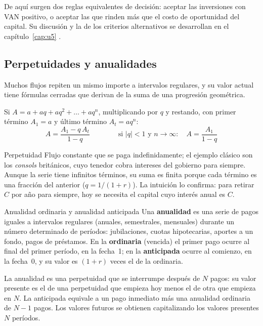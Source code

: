 De aquí surgen dos reglas equivalentes de decisión: aceptar las inversiones con VAN positivo, o aceptar las que rinden más que el costo de oportunidad del capital. Su discusión y la de los criterios alternativos se desarrollan en el capítulo~\ref{cap:u5} .

\subsection{Perpetuidades y anualidades}

Muchos flujos repiten un mismo importe a intervalos regulares, y su valor actual tiene fórmulas cerradas que derivan de la suma de una progresión geométrica.

\begin{formulaBox}
Si $A = a + aq + aq^2 + \dots + aq^n$, multiplicando por $q$ y restando, con primer término $A_1 = a$ y último término $A_t = aq^n$:
\[
A = \frac{A_1 - q\,A_t}{1-q}
\qquad\qquad
\text{si } |q|<1 \text{ y } n\to\infty:\quad A = \frac{A_1}{1-q}
\]
\end{formulaBox}

\begin{definicion}{Perpetuidad}
Flujo constante que se paga indefinidamente; el ejemplo clásico son los \emph{consols} británicos, cuyo tenedor cobra intereses del gobierno para siempre. Aunque la serie tiene infinitos términos, su suma es finita porque cada término es una fracción del anterior ($q = 1/(1+r)$). La intuición lo confirma: para retirar $C$ por año para siempre, hoy se necesita el capital cuyo interés anual es $C$.
\end{definicion}

\begin{definicion}{Anualidad ordinaria y anualidad anticipada}
Una \textbf{anualidad} es una serie de pagos iguales a intervalos regulares (anuales, semestrales, mensuales) durante un número determinado de períodos: jubilaciones, cuotas hipotecarias, aportes a un fondo, pagos de préstamos. En la \textbf{ordinaria} (vencida) el primer pago ocurre al final del primer período, en la fecha~1; en la \textbf{anticipada} ocurre al comienzo, en la fecha~0, y su valor es $(1+r)$ veces el de la ordinaria.
\end{definicion}

La anualidad es una perpetuidad que se interrumpe después de $N$ pagos: su valor presente es el de una perpetuidad que empieza hoy menos el de otra que empieza en $N$. La anticipada equivale a un pago inmediato más una anualidad ordinaria de $N-1$ pagos. Los valores futuros se obtienen capitalizando los valores presentes $N$ períodos.

